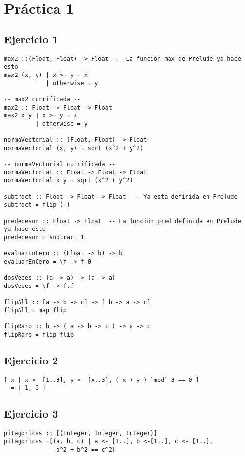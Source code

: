 \section{Práctica 1}
\subsection{Ejercicio 1}
\begin{centrado}
\begin{verbatim}
max2 ::(Float, Float) -> Float	-- La función max de Prelude ya hace esto
max2 (x, y) | x >= y = x        
            | otherwise = y

-- max2 currificada --
max2 :: Float -> Float -> Float
max2 x y | x >= y = x
         | otherwise = y

normaVectorial :: (Float, Float) -> Float
normaVectorial (x, y) = sqrt (x^2 + y^2)

-- normaVectorial currificada --
normaVectorial :: Float -> Float -> Float
normaVectorial x y = sqrt (x^2 + y^2)

subtract :: Float -> Float -> Float  -- Ya esta definida en Prelude
subtract = flip (-)

predecesor :: Float -> Float  -- La función pred definida en Prelude ya hace esto
predecesor = subtract 1

evaluarEnCero :: (Float -> b) -> b
evaluarEnCero = \f -> f 0

dosVeces :: (a -> a) -> (a -> a)
dosVeces = \f -> f.f

flipAll :: [a -> b -> c] -> [ b -> a -> c]
flipAll = map flip

flipRaro :: b -> ( a -> b -> c ) -> a -> c
flipRaro = flip flip
\end{verbatim}
\end{centrado}

\subsection{Ejercicio 2}
\begin{centrado}
\begin{verbatim}
[ x | x <- [1..3], y <- [x..3], ( x + y ) `mod` 3 == 0 ] 
  = [ 1, 3 ]
\end{verbatim}
\end{centrado}

\newpage
\subsection{Ejercicio 3}
\begin{centrado}
\begin{verbatim}
pitagoricas :: [(Integer, Integer, Integer)]
pitagoricas =[(a, b, c) | a <- [1..], b <-[1..], c <- [1..], 
               a^2 + b^2 == c^2]
\end{verbatim}
\end{centrado}

